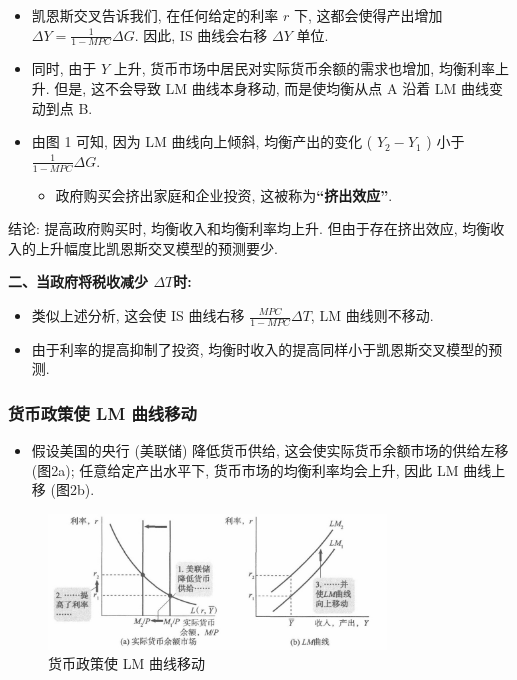 \documentclass[]{ctexart}
\begin{document}
\begin{itemize}
\item
  凯恩斯交叉告诉我们,  在任何给定的利率 $r$ 下, 这都会使得产出增加
  \(\Delta Y= \frac{1}{1-MPC} \Delta G\). 因此, IS 曲线会右移
  \(\Delta Y\) 单位. 
\item
  同时,  由于 $Y$ 上升,  货币市场中居民对实际货币余额的需求也增加,  均衡利率上升. 但是,  这不会导致
  LM 曲线本身移动,  而是使均衡从点 A 沿着 LM 曲线变动到点 B.
\item
  由图 1 可知,  因为 LM 曲线向上倾斜,  均衡产出的变化 ( \(Y_2 - Y_1\) ) 小于
  \(\frac{1}{1-MPC} \Delta G\).

  \begin{itemize}
  \item
    政府购买会挤出家庭和企业投资,  这被称为\textbf{``挤出效应''}. 
  \end{itemize}
\end{itemize}

结论: 提高政府购买时, 均衡收入和均衡利率均上升. 
但由于存在挤出效应, 均衡收入的上升幅度比凯恩斯交叉模型的预测要少. 

\textbf{二、当政府将税收减少 \(\Delta T\)时:}

\begin{itemize}
\item
  类似上述分析,  这会使 IS 曲线右移 \(\frac{MPC}{1-MPC} \Delta T\),  LM 曲线则不移动. 
\item
  由于利率的提高抑制了投资, 均衡时收入的提高同样小于凯恩斯交叉模型的预测. 
\end{itemize}

\subsubsection*{货币政策使 LM 曲线移动}

\begin{itemize}
\item
  假设美国的央行 (美联储) 降低货币供给, 这会使实际货币余额市场的供给左移(图2a); 任意给定产出水平下, 货币市场的均衡利率均会上升, 因此 LM 曲线上移 (图2b). 
\end{itemize}

\begin{figure}
\centering
\includegraphics[width=0.8\textwidth]{fig2/lm-1.jpeg}
\caption{货币政策使 LM 曲线移动}
\end{figure}
\end{document}
